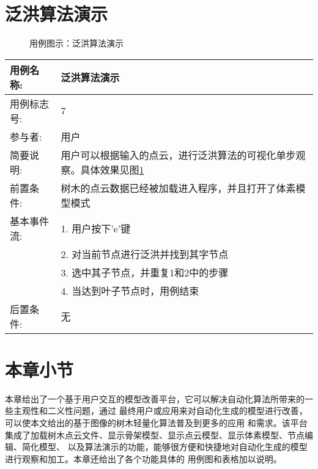 \clearpage
\section{泛洪算法演示}
\begin{figure}[H]
	\centering
	\hfill
	\hfill
	\hfill
	\caption{用例图示：泛洪算法演示}
	\label{fig:uc7}
\end{figure}

\begin{table}[H]
	\centering
\begin{tabular}{|l|p{8cm}|}
	\hline
	用例名称: & 泛洪算法演示\\
	\hline
	用例标志号: & 7\\
	\hline
	参与者: & 用户\\
	\hline
	简要说明: & 用户可以根据输入的点云，进行泛洪算法的可视化单步观察。具体效果见图\ref{fig:uc7}\\
	\hline
	前置条件: & 树木的点云数据已经被加载进入程序，并且打开了体素模型模式\\
	\hline
	基本事件流: & 1. 用户按下'e'键\\
	 & 2. 对当前节点进行泛洪并找到其字节点\\
	 & 3. 选中其子节点，并重复1和2中的步骤\\
	 & 4. 当达到叶子节点时，用例结束\\
	\hline
	后置条件: & 无\\
	\hline
\end{tabular}
\end{table}

\clearpage
\section{本章小节}
本章给出了一个基于用户交互的模型改善平台，它可以解决自动化算法所带来的一些主观性和二义性问题，通过
最终用户或应用来对自动化生成的模型进行改善，可以使本文给出的基于图像的树木轻量化算法普及到更多的应用
和需求。该平台集成了加载树木点云文件、显示骨架模型、显示点云模型、显示体素模型、节点编辑、简化模型、
以及算法演示的功能，能够很方便和快捷地对自动化生成的模型进行观察和加工。本章还给出了各个功能具体的
用例图和表格加以说明。
